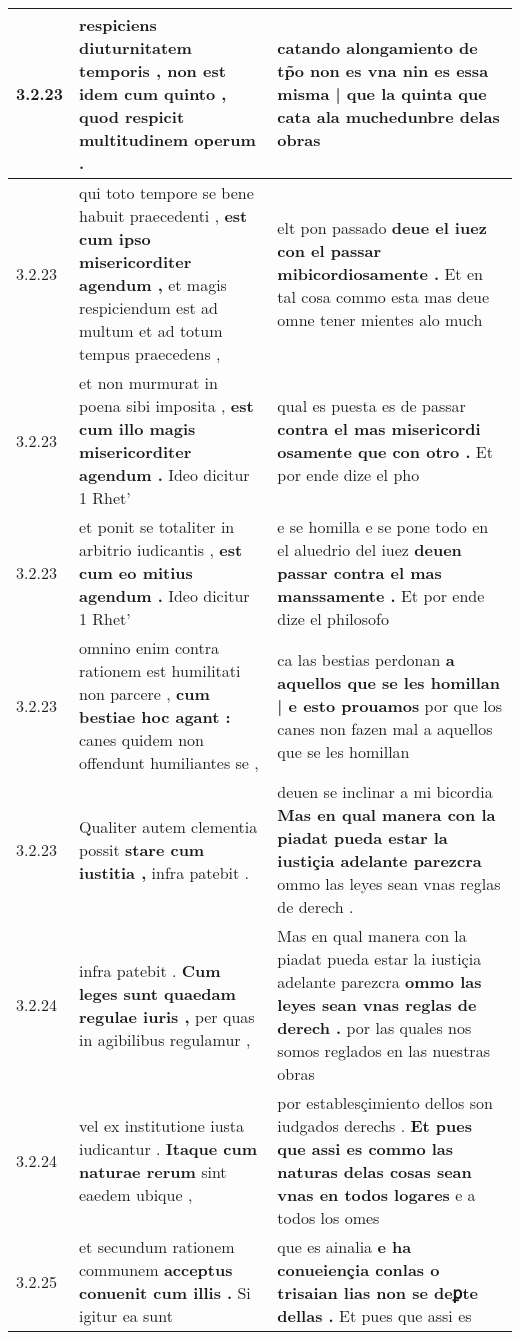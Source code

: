 \begin{tabular}{|p{1cm}|p{6.5cm}|p{6.5cm}|}
3.2.23 & respiciens diuturnitatem temporis , \textbf{ non est idem cum quinto , } quod respicit multitudinem operum . & catando alongamiento de tp̃o non es vna \textbf{ nin es essa misma | que la quinta } que cata ala muchedunbre delas obras \\\hline
3.2.23 & qui toto tempore se bene habuit praecedenti , \textbf{ est cum ipso misericorditer agendum , } et magis respiciendum est ad multum et ad totum tempus praecedens , & elt pon passado \textbf{ deue el iuez con el passar mibicordiosamente . } Et en tal cosa commo esta mas deue omne tener mientes alo much \\\hline
3.2.23 & et non murmurat in poena sibi imposita , \textbf{ est cum illo magis misericorditer agendum . } Ideo dicitur 1 Rhet’ & qual es puesta es de passar \textbf{ contra el mas misericordi osamente que con otro . } Et por ende dize el pho \\\hline
3.2.23 & et ponit se totaliter in arbitrio iudicantis , \textbf{ est cum eo mitius agendum . } Ideo dicitur 1 Rhet’ & e se homilla e se pone todo en el aluedrio del iuez \textbf{ deuen passar contra el mas manssamente . } Et por ende dize el philosofo \\\hline
3.2.23 & omnino enim contra rationem est humilitati non parcere , \textbf{ cum bestiae hoc agant : } canes quidem non offendunt humiliantes se , & ca las bestias perdonan \textbf{ a aquellos que se les homillan | e esto prouamos } por que los canes non fazen mal a aquellos que se les homillan \\\hline
3.2.23 & Qualiter autem clementia possit \textbf{ stare cum iustitia , } infra patebit . & deuen se inclinar a mi bicordia \textbf{ Mas en qual manera con la piadat pueda estar la iustiçia adelante parezcra } ommo las leyes sean vnas reglas de derech . \\\hline
3.2.24 & infra patebit . \textbf{ Cum leges sunt quaedam regulae iuris , } per quas in agibilibus regulamur , & Mas en qual manera con la piadat pueda estar la iustiçia adelante parezcra \textbf{ ommo las leyes sean vnas reglas de derech . } por las quales nos somos reglados en las nuestras obras \\\hline
3.2.24 & vel ex institutione iusta iudicantur . \textbf{ Itaque cum naturae rerum } sint eaedem ubique , & por establesçimiento dellos son iudgados derechs . \textbf{ Et pues que assi es commo las naturas delas cosas sean vnas en todos logares } e a todos los omes \\\hline
3.2.25 & et secundum rationem communem \textbf{ acceptus conuenit cum illis . } Si igitur ea sunt & que es ainalia \textbf{ e ha conueiençia conlas o trisaian lias non se deꝑte dellas . } Et pues que assi es \\\hline

\end{tabular}
